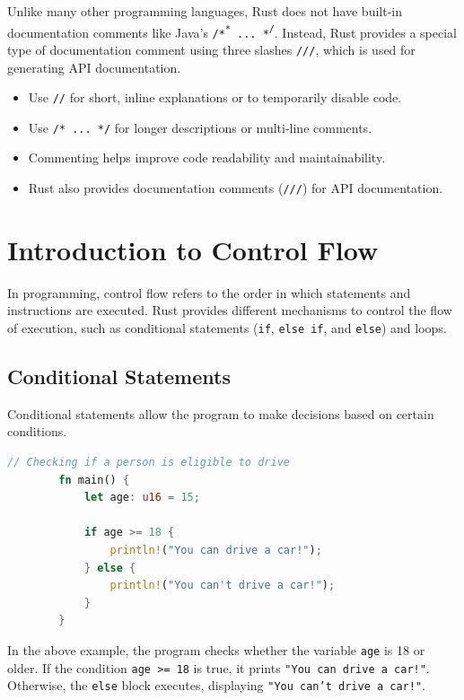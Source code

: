 \documentclass[a4paper,12pt]{report}
\begin{document}
		\noindent Unlike many other programming languages, Rust does not have built-in documentation comments like Java’s \texttt{/*\textsuperscript{*} ... *\textsuperscript{/}}. Instead, Rust provides a special type of documentation comment using three slashes \texttt{///}, which is used for generating API documentation.
	
	\begin{takeawaybox}
		\begin{itemize}
			\item Use \texttt{//} for short, inline explanations or to temporarily disable code.
			\item Use \texttt{/* ... */} for longer descriptions or multi-line comments.
			\item Commenting helps improve code readability and maintainability.
			\item Rust also provides documentation comments (\texttt{///}) for API documentation.
		\end{itemize}
	\end{takeawaybox}
	
	
\section{Introduction to Control Flow}
	
	In programming, control flow refers to the order in which statements and instructions are executed. Rust provides different mechanisms to control the flow of execution, such as conditional statements (\texttt{if}, \texttt{else if}, and \texttt{else}) and loops.
	
	\subsection*{Conditional Statements}
	
	Conditional statements allow the program to make decisions based on certain conditions.
	
	\begin{lstlisting}[language=Rust]
		// Checking if a person is eligible to drive
		fn main() {
			let age: u16 = 15;
			
			if age >= 18 {
				println!("You can drive a car!");
			} else {
				println!("You can't drive a car!");
			}
		}
	\end{lstlisting}
	
		\noindent In the above example, the program checks whether the variable \texttt{age} is 18 or older. If the condition \texttt{age >= 18} is true, it prints \texttt{"You can drive a car!"}. Otherwise, the \texttt{else} block executes, displaying \texttt{"You can't drive a car!"}.
	
\end{document}
